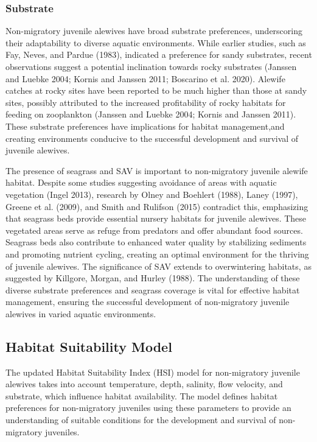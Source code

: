 \documentclass[
]{book}
\begin{document}
\hypertarget{substrate-1}{%
\subsubsection{Substrate}\label{substrate-1}}

Non-migratory juvenile alewives have broad substrate preferences, underscoring their adaptability to diverse aquatic environments. While earlier studies, such as Fay, Neves, and Pardue (1983), indicated a preference for sandy substrates, recent observations suggest a potential inclination towards rocky substrates (Janssen and Luebke 2004; Kornis and Janssen 2011; Boscarino et al. 2020). Alewife catches at rocky sites have been reported to be much higher than those at sandy sites, possibly attributed to the increased profitability of rocky habitats for feeding on zooplankton (Janssen and Luebke 2004; Kornis and Janssen 2011). These substrate preferences have implications for habitat management,and creating environments conducive to the successful development and survival of juvenile alewives.

The presence of seagrass and SAV is important to non-migratory juvenile alewife habitat. Despite some studies suggesting avoidance of areas with aquatic vegetation (Ingel 2013), research by Olney and Boehlert (1988), Laney (1997), Greene et al. (2009), and Smith and Rulifson (2015) contradict this, emphasizing that seagrass beds provide essential nursery habitats for juvenile alewives. These vegetated areas serve as refuge from predators and offer abundant food sources. Seagrass beds also contribute to enhanced water quality by stabilizing sediments and promoting nutrient cycling, creating an optimal environment for the thriving of juvenile alewives. The significance of SAV extends to overwintering habitats, as suggested by Killgore, Morgan, and Hurley (1988). The understanding of these diverse substrate preferences and seagrass coverage is vital for effective habitat management, ensuring the successful development of non-migratory juvenile alewives in varied aquatic environments.

\hypertarget{habitat-suitability-model-1}{%
\subsection{Habitat Suitability Model}\label{habitat-suitability-model-1}}

The updated Habitat Suitability Index (HSI) model for non-migratory juvenile alewives takes into account temperature, depth, salinity, flow velocity, and substrate, which influence habitat availability. The model defines habitat preferences for non-migratory juveniles using these parameters to provide an understanding of suitable conditions for the development and survival of non-migratory juveniles.
\end{document}
